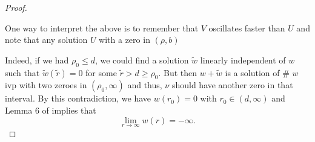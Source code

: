 \begin{proof}
\begin{emph}
    One way to interpret the above is to remember that $V$ oscillates faster
    than $U$ and note that any solution $U$ with a zero in $(\rho, b)$ 
\end{emph}

Indeed, if we had $\rho_0 \leq d$, we could find a solution $\tilde{w}$ linearly
independent of $w$ such that $\tilde{w}(\tilde{r}) = 0$ for some $\tilde{r} > d
\geq \rho_0$. But then $w + \tilde{w}$ is a solution of \# $w$ ivp with two
zeroes in $(\rho_0, \infty)$ and thus, $\nu$ should have another zero in {\red that
interval}. By this contradiction, we have $w(r_0) = 0$ with $r_0 \in (d,
\infty)$ and Lemma 6 of \cite[p.~249]{kwong} implies that
\[ \underset{r\to\infty}{\lim} w(r) = -\infty. \]


% 

\end{proof}
